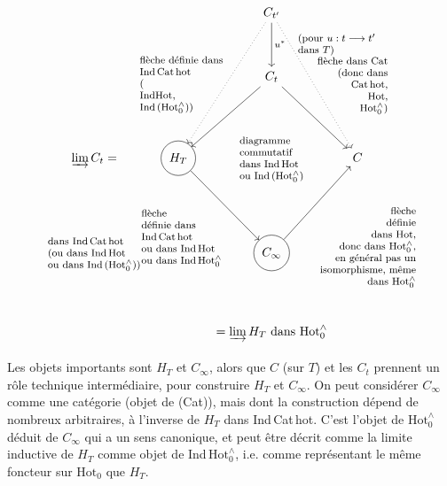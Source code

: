 \documentclass[11pt]{article}
\makeatletter
\newcommand{\printedpage}[1]{\marginpar{\footnotesize p.~#1}}
\newcommand{\msp}[1]{\marginpar{\footnotesize [#1]}}
\newcommand{\Hotz}{\mathrm{Hot}^{\wedge}_{0}}
\newcommand{\lab}[2][l]{\text{\footnotesize\begin{tabular}{@{}#1@{}}#2\end{tabular}}}
\makeatother
\begin{document}
\msp{page 114}
\printedpage{72}
\[
\begin{tikzcd}[column sep=small, row sep=huge]
 & & C_{t'} \arrow[d, "{u^{*}\quad\lab{(pour $u : t \longrightarrow t'$\\ dans $T$)}}"] \arrow[ldd, dotted] \arrow[rdd, dotted] & \\
 & & C_{t} \arrow[ld, swap, "{\lab{flèche définie dans\\ Ind\,Cat\,hot\\ (\\ IndHot,\\ Ind\,($\Hotz$))}}"] \arrow[rd, "{\lab[r]{flèche dans Cat\\ (donc dans\\ Cat\,hot,\\ Hot,\\ $\Hotz$)}}"] & \\
\varinjlim C_{t} = & |[draw, circle]| H_{T} \arrow[rd, swap, "{\lab{flèche\\ définie dans\\ Ind\,Cat\,hot\\ ou dans Ind\,Hot\\ ou dans Ind\,$\Hotz$}}"] & \lab{diagramme\\ commutatif\\ dans Ind\,Hot\\ ou Ind\,($\Hotz$)} & C \\
\lab{dans Ind\,Cat\,hot\\ (ou dans Ind\,Hot\\ ou dans Ind\,($\Hotz$))} & & |[draw, circle]| C_{\infty} \arrow[ru, swap, "{\lab[r]{flèche\\ définie\\ dans Hot,\\ donc dans $\Hotz$,\\ en général pas un\\ isomorphisme, même\\ dans $\Hotz$}}"] & \\
 & & = \varinjlim H_{T} \text{ dans } \Hotz &
\end{tikzcd}
\]



Les objets importants sont $H_{T}$ et $C_{\infty}$, alors que $C$ (sur $T$) et les $C_{t}$ prennent un rôle technique intermédiaire, pour construire $H_{T}$ et $C_{\infty}$. On peut considérer $C_{\infty}$ comme une catégorie (objet de (Cat)), mais dont la construction dépend de nombreux arbitraires, à l'inverse de $H_{T}$ dans Ind\,Cat\,hot. C'est l'objet de $\Hotz$ déduit de $C_{\infty}$ qui a un sens canonique, et peut être décrit comme la limite inductive de $H_{T}$ comme objet de Ind\,$\Hotz$, i.e. comme représentant le même foncteur sur $\mathrm{Hot}_{0}$ que $H_{T}$.
\end{document}
